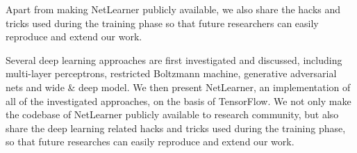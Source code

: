 Apart from making NetLearner publicly available, we also share the hacks and tricks
used during the training phase so that future researchers can easily reproduce and extend our work.

Several deep learning approaches are first investigated and discussed,
including multi-layer perceptrons, restricted Boltzmann machine, generative adversarial nets and wide \& deep model.
We then present NetLearner, an implementation of all of the investigated approaches,
on the basis of TensorFlow.
We not only make the codebase of NetLearner publicly available to research community,
but also share the deep learning related hacks and tricks used during the training phase,
so that future researches can easily reproduce and extend our work.
